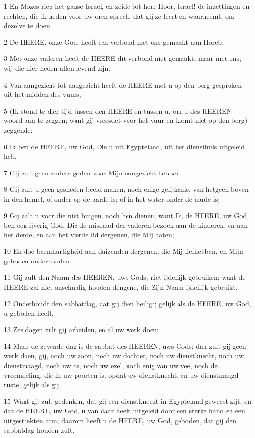 \par 1 En Mozes riep het ganse Israel, en zeide tot hen: Hoor, Israel! de inzettingen en rechten, die ik heden voor uw oren spreek, dat gij ze leert en waarneemt, om dezelve te doen.
\par 2 De HEERE, onze God, heeft een verbond met ons gemaakt aan Horeb.
\par 3 Met onze vaderen heeft de HEERE dit verbond niet gemaakt, maar met ons, wij die hier heden allen levend zijn.
\par 4 Van aangezicht tot aangezicht heeft de HEERE met u op den berg gesproken uit het midden des vuurs,
\par 5 (Ik stond te dier tijd tussen den HEERE en tussen u, om u des HEEREN woord aan te zeggen; want gij vreesdet voor het vuur en klomt niet op den berg) zeggende:
\par 6 Ik ben de HEERE, uw God, Die u uit Egypteland, uit het diensthuis uitgeleid heb.
\par 7 Gij zult geen andere goden voor Mijn aangezicht hebben.
\par 8 Gij zult u geen gesneden beeld maken, noch enige gelijkenis, van hetgeen boven in den hemel, of onder op de aarde is; of in het water onder de aarde is;
\par 9 Gij zult u voor die niet buigen, noch hen dienen; want Ik, de HEERE, uw God, ben een ijverig God, Die de misdaad der vaderen bezoek aan de kinderen, en aan het derde, en aan het vierde lid dergenen, die Mij haten;
\par 10 En doe barmhartigheid aan duizenden dergenen, die Mij liefhebben, en Mijn geboden onderhouden.
\par 11 Gij zult den Naam des HEEREN, uws Gods, niet ijdellijk gebruiken; want de HEERE zal niet onschuldig houden dengene, die Zijn Naam ijdellijk gebruikt.
\par 12 Onderhoudt den sabbatdag, dat gij dien heiligt; gelijk als de HEERE, uw God, u geboden heeft.
\par 13 Zes dagen zult gij arbeiden, en al uw werk doen;
\par 14 Maar de zevende dag is de sabbat des HEEREN, uws Gods; dan zult gij geen werk doen, gij, noch uw zoon, noch uw dochter, noch uw dienstknecht, noch uw dienstmaagd, noch uw os, noch uw ezel, noch enig van uw vee, noch de vreemdeling, die in uw poorten is; opdat uw dienstknecht, en uw dienstmaagd ruste, gelijk als gij.
\par 15 Want gij zult gedenken, dat gij een dienstknecht in Egypteland geweest zijt, en dat de HEERE, uw God, u van daar heeft uitgeleid door een sterke hand en een uitgestrekten arm; daarom heeft u de HEERE, uw God, geboden, dat gij den sabbatdag houden zult.
